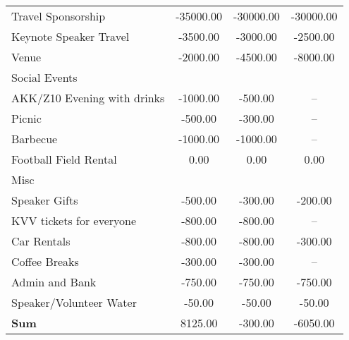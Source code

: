 \begin{tabularx}{\linewidth}{XSSS}
\hspace*{1em} Travel Sponsorship  & -35000.00 & -30000.00 & -30000.00\\
\hspace*{1em} Keynote Speaker Travel  & -3500.00 & -3000.00 & -2500.00\\
\hspace*{1em} Venue  & -2000.00 & -4500.00 & -8000.00\\
\hspace*{1em} Social Events  & {} & {} & {}\\
\hspace*{1em} \hspace*{1em} AKK/Z10 Evening with drinks & -1000.00 & -500.00 & {–}\\
\hspace*{1em} \hspace*{1em} Picnic & -500.00 & -300.00 & {–}\\
\hspace*{1em} \hspace*{1em} Barbecue & -1000.00 & -1000.00 & {–}\\
\hspace*{1em} \hspace*{1em} Football Field Rental & 0.00 & 0.00 & 0.00\\
\hspace*{1em} Misc  & {} & {} & {}\\
\hspace*{1em} \hspace*{1em} Speaker Gifts & -500.00 & -300.00 & -200.00\\
\hspace*{1em} \hspace*{1em} KVV tickets for everyone & -800.00 & -800.00 & {–}\\
\hspace*{1em} \hspace*{1em} Car Rentals & -800.00 & -800.00 & -300.00\\
\hspace*{1em} \hspace*{1em} Coffee Breaks & -300.00 & -300.00 & {–}\\
\hspace*{1em} \hspace*{1em} Admin and Bank & -750.00 & -750.00 & -750.00\\
\hspace*{1em} \hspace*{1em} Speaker/Volunteer Water & -50.00 & -50.00 & -50.00\\[0.5ex]\hline
\bf Sum \hspace*{1em}  & 8125.00 & -300.00 & -6050.00\\
\end{tabularx}

\newpage
